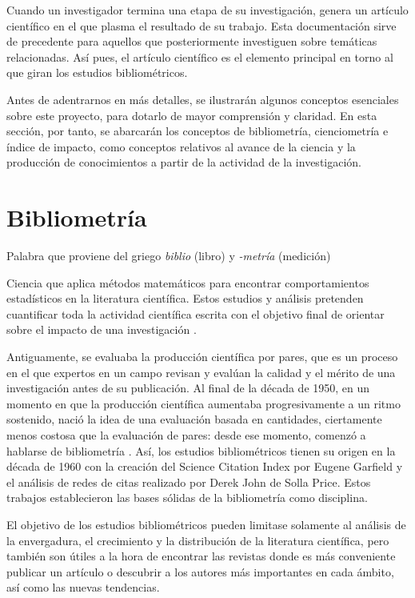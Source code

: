 
Cuando un investigador termina una etapa de su investigación, genera un artículo científico en el que plasma el resultado de su trabajo. Esta documentación sirve de precedente para aquellos que posteriormente investiguen sobre temáticas relacionadas. Así pues, el artículo científico es el elemento principal en torno al que giran los estudios bibliométricos.

Antes de adentrarnos en más detalles, se ilustrarán algunos conceptos esenciales sobre este proyecto, para dotarlo de mayor comprensión y claridad. En esta sección, por tanto, se abarcarán los conceptos de bibliometría, cienciometría e índice de impacto, como conceptos relativos al avance de la ciencia y la producción de conocimientos a partir de la actividad de la investigación.


\section{Bibliometría}

Palabra que proviene del griego \textit{biblio} (libro) y \textit{-metría} (medición)

Ciencia que aplica métodos matemáticos para encontrar comportamientos estadísticos en la literatura científica. Estos estudios y análisis pretenden cuantificar toda la actividad científica escrita con el objetivo final de orientar sobre el impacto de una investigación \cite{Amat1989}.

Antiguamente, se evaluaba la producción científica por pares, que es un proceso en el que expertos en un campo revisan y evalúan la calidad y el mérito de una investigación antes de su publicación. 
Al final de la década de 1950, en un momento en que la producción científica aumentaba progresivamente a un ritmo sostenido, nació la idea de una evaluación basada en cantidades, ciertamente menos costosa que la evaluación de pares: desde ese momento, comenzó a hablarse de bibliometría \cite{Turbanti2017}.
Así, los estudios bibliométricos tienen su origen en la década de 1960 con la creación del Science Citation Index por Eugene Garfield y el análisis de redes de citas realizado por Derek John de Solla Price. Estos trabajos establecieron las bases sólidas de la bibliometría como disciplina.

El objetivo de los estudios bibliométricos pueden limitase solamente al análisis de la envergadura, el crecimiento y la distribución de la literatura científica, pero también son útiles a la hora de encontrar las revistas donde es más conveniente publicar un artículo o descubrir a los autores más importantes en cada ámbito, así como las nuevas tendencias.

